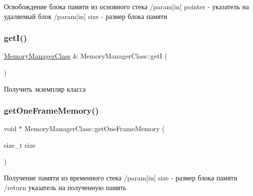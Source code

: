 Освобождение блока памяти из основного стека /param\mbox{[}in\mbox{]} pointer -\/ указатель на удаляемый блок /param\mbox{[}in\mbox{]} size -\/ размер блока памяти 

\mbox{\label{class_memory_manager_class_ab4c7d7b5820dde4d7d361bd9b1f7b41c}} 
\subsubsection{\texorpdfstring{get\+I()}{getI()}}
{\footnotesize\ttfamily \hyperlink{class_memory_manager_class}{Memory\+Manager\+Class} \& Memory\+Manager\+Class\+::getI (\begin{DoxyParamCaption}{ }\end{DoxyParamCaption})\hspace{0.3cm}{\ttfamily [static]}}



Получить экземпляр класса 

\mbox{\label{class_memory_manager_class_a9538dd34a176127732b15e29c20ef629}} 
\subsubsection{\texorpdfstring{get\+One\+Frame\+Memory()}{getOneFrameMemory()}}
{\footnotesize\ttfamily void $\ast$ Memory\+Manager\+Class\+::get\+One\+Frame\+Memory (\begin{DoxyParamCaption}\item[{size\+\_\+t}]{size }\end{DoxyParamCaption})}



Получение памяти из временного стека /param\mbox{[}in\mbox{]} size -\/ размер блока памяти /return указатель на полученную память 

\mbox{\label{class_memory_manager_class_a66ed5036828511d3e123503edba0bfd5}} 
